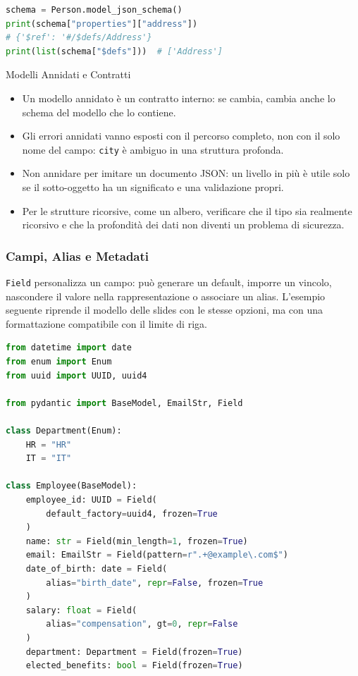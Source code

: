 \documentclass[12pt]{extarticle}
\begin{document}
\begin{lstlisting}[language=Python]
schema = Person.model_json_schema()
print(schema["properties"]["address"])
# {'$ref': '#/$defs/Address'}
print(list(schema["$defs"]))  # ['Address']
\end{lstlisting}

\begin{cbox}{Modelli Annidati e Contratti}
\begin{itemize}
    \item Un modello annidato è un contratto interno: se cambia, cambia anche lo schema del modello che lo contiene.
    \item Gli errori annidati vanno esposti con il percorso completo, non con il solo nome del campo: \texttt{city} è ambiguo in una struttura profonda.
    \item Non annidare per imitare un documento JSON: un livello in più è utile solo se il sotto-oggetto ha un significato e una validazione propri.
    \item Per le strutture ricorsive, come un albero, verificare che il tipo sia realmente ricorsivo e che la profondità dei dati non diventi un problema di sicurezza.
\end{itemize}
\end{cbox}

\subsubsection{Campi, Alias e Metadati}

\noindent \texttt{Field} personalizza un campo: può generare un default, imporre un vincolo, nascondere il valore nella rappresentazione o associare un alias. L'esempio seguente riprende il modello delle slides con le stesse opzioni, ma con una formattazione compatibile con il limite di riga.

\begin{lstlisting}[language=Python]
from datetime import date
from enum import Enum
from uuid import UUID, uuid4

from pydantic import BaseModel, EmailStr, Field

class Department(Enum):
    HR = "HR"
    IT = "IT"

class Employee(BaseModel):
    employee_id: UUID = Field(
        default_factory=uuid4, frozen=True
    )
    name: str = Field(min_length=1, frozen=True)
    email: EmailStr = Field(pattern=r".+@example\.com$")
    date_of_birth: date = Field(
        alias="birth_date", repr=False, frozen=True
    )
    salary: float = Field(
        alias="compensation", gt=0, repr=False
    )
    department: Department = Field(frozen=True)
    elected_benefits: bool = Field(frozen=True)
\end{lstlisting}
\end{document}
